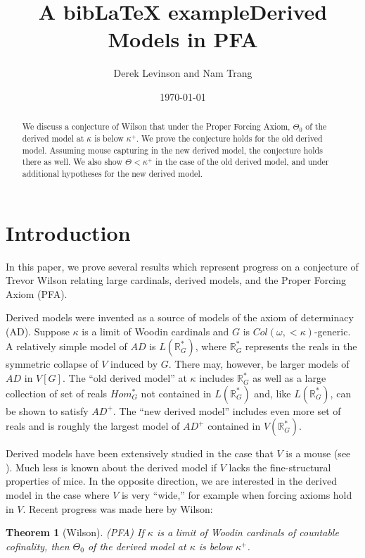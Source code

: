 \documentclass[12pt]{article}
\title{A bibLaTeX example}
\title{Derived Models in PFA}
\author{Derek Levinson and Nam Trang}
\date{\today}
\newtheorem{theorem}{Theorem}[section]
\newcommand\R{\mathbb{R}}
\begin{document}
\maketitle
\thispagestyle{firstpage}

\begin{abstract}
    We discuss a conjecture of Wilson that under the Proper Forcing Axiom, $\Theta_0$ of the derived model at $\kappa$ is below $\kappa^+$. We prove the conjecture holds for the old derived model. Assuming mouse capturing in the new derived model, the conjecture holds there as well. We also show $\Theta < \kappa^+$ in the case of the old derived model, and under additional hypotheses for the new derived model.
\end{abstract}

\section{Introduction}

In this paper, we prove several results which represent progress on a conjecture of Trevor Wilson relating large cardinals, derived models, and the Proper Forcing Axiom (PFA).

Derived models were invented as a source of models of the axiom of determinacy (AD). Suppose $\kappa$ is a limit of Woodin cardinals and $G$ is $Col(\omega,<\kappa)$-generic. A relatively simple model of $AD$ is $L(\R^*_G)$, where $\R^*_G$ represents the reals in the symmetric collapse of $V$ induced by $G$. There may, however, be larger models of $AD$ in $V[G]$. The ``old derived model'' at $\kappa$ includes $\R^*_G$ as well as a large collection of set of reals $Hom^*_G$ not contained in $L(\R^*_G)$ and, like $L(\R^*_G)$, can be shown to satisfy $AD^+$. The ``new derived model'' includes even more set of reals and is roughly the largest model of $AD^+$ contained in $V(\R^*_G)$.

Derived models have been extensively studied in the case that $V$ is a mouse (see \cite{dmatm}). Much less is known about the derived model if $V$ lacks the fine-structural properties of mice. In the opposite direction, we are interested in the derived model in the case where $V$ is very ``wide,'' for example when forcing axioms hold in $V$. Recent progress was made here by Wilson:

\begin{theorem}[Wilson]
\label{wilson thm}
    (PFA) If $\kappa$ is a limit of Woodin cardinals of countable cofinality, then $\Theta_0$ of the derived model at $\kappa$ is below $\kappa^+$.
\end{theorem}
\end{document}
